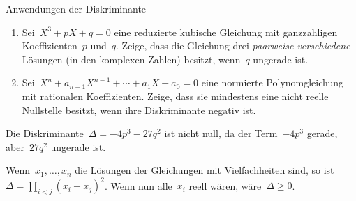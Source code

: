 \documentclass{algblatt}
\begin{document}
\vspace*{-1.5cm}

\begin{aufgabe}{Anwendungen der Diskriminante}
\begin{enumerate}
\item
Sei~$X^3 + p X + q = 0$ eine reduzierte kubische Gleichung mit ganzzahligen
Koeffizienten~$p$ und~$q$. Zeige, dass die Gleichung drei \emph{paarweise verschiedene} Lösungen
(in den komplexen Zahlen) besitzt, wenn~$q$ ungerade ist.
\item Sei~$X^n + a_{n-1}X^{n-1} + \cdots + a_1 X + a_0 = 0$ eine normierte
Polynomgleichung mit rationalen Koeffizienten. Zeige, dass sie mindestens eine
nicht reelle Nullstelle besitzt, wenn ihre Diskriminante negativ ist.
\end{enumerate}

\begin{loesungE}
\item Die Diskriminante~$\Delta = -4p^3 - 27q^2$ ist nicht null, da der
Term~$-4p^3$ gerade, aber~$27q^2$ ungerade ist.
\item Wenn~$x_1,\ldots,x_n$ die Lösungen der Gleichungen mit Vielfachheiten
sind, so ist~$\Delta = \prod_{i < j} (x_i-x_j)^2$. Wenn nun alle~$x_i$ reell
wären, wäre~$\Delta \geq 0$.
\end{loesungE}
\end{aufgabe}
\end{document}

